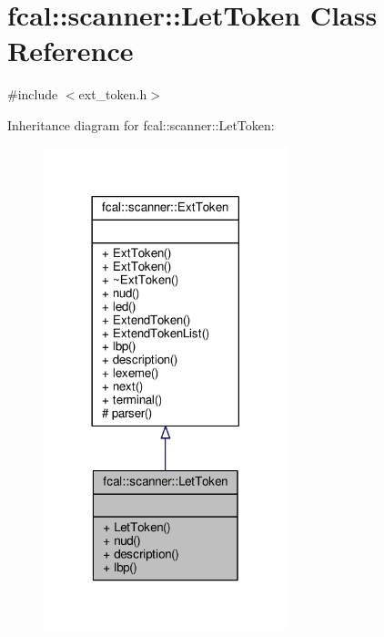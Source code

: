 \hypertarget{classfcal_1_1scanner_1_1LetToken}{}\section{fcal\+:\+:scanner\+:\+:Let\+Token Class Reference}
\label{classfcal_1_1scanner_1_1LetToken}


{\ttfamily \#include $<$ext\+\_\+token.\+h$>$}



Inheritance diagram for fcal\+:\+:scanner\+:\+:Let\+Token\+:
\nopagebreak
\begin{figure}[H]
\begin{center}
\leavevmode
\includegraphics[width=201pt]{classfcal_1_1scanner_1_1LetToken__inherit__graph}
\end{center}
\end{figure}


